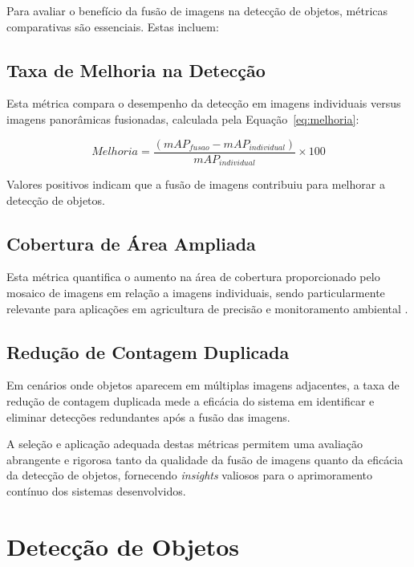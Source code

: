 Para avaliar o benefício da fusão de imagens na detecção de objetos, métricas comparativas são essenciais. Estas incluem:

\subsection*{Taxa de Melhoria na Detecção}

Esta métrica compara o desempenho da detecção em imagens individuais versus imagens panorâmicas fusionadas, calculada pela Equação~\ref{eq:melhoria}:

\begin{equation}
\label{eq:melhoria}
Melhoria = \frac{(mAP_{fusao} - mAP_{individual})}{mAP_{individual}} \times 100
\end{equation}

Valores positivos indicam que a fusão de imagens contribuiu para melhorar a detecção de objetos.

\subsection*{Cobertura de Área Ampliada}

Esta métrica quantifica o aumento na área de cobertura proporcionado pelo mosaico de imagens em relação a imagens individuais, sendo particularmente relevante para aplicações em agricultura de precisão e monitoramento ambiental \cite{kentsch2020applications}.

\subsection*{Redução de Contagem Duplicada}

Em cenários onde objetos aparecem em múltiplas imagens adjacentes, a taxa de redução de contagem duplicada mede a eficácia do sistema em identificar e eliminar detecções redundantes após a fusão das imagens.

A seleção e aplicação adequada destas métricas permitem uma avaliação abrangente e rigorosa tanto da qualidade da fusão de imagens quanto da eficácia da detecção de objetos, fornecendo \textit{insights} valiosos para o aprimoramento contínuo dos sistemas desenvolvidos.




\section{Detecção de Objetos}\label{sec:deteccao}

